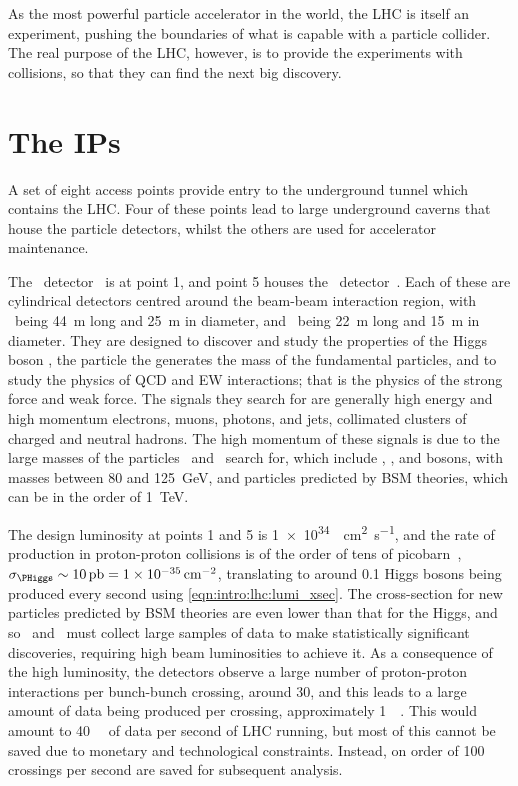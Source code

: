 As the most powerful particle accelerator in the world, the \ac{LHC} is itself 
an experiment, pushing the boundaries of what is capable with a particle 
collider.
The real purpose of the \ac{LHC}, however, is to provide the experiments with 
collisions, so that they can find the next big discovery.

\section{The \aclp{IP}}
\label{chap:intro:lhc:ips}

A set of eight access points provide entry to the underground tunnel which 
contains the \ac{LHC}.
Four of these points lead to large underground caverns that house the particle 
detectors, whilst the others are used for accelerator maintenance.

The \atlas\ detector~\cite{Aad:2008zzm} is at point 1, and point 5 houses the 
\cms\ detector~\cite{Chatrchyan:2008aa}.
Each of these are cylindrical detectors centred around the beam-beam 
interaction region, with \atlas\ being \SI{44}{\metre} long and \SI{25}{\metre} 
in diameter, and \cms\ being \SI{22}{\metre} long and \SI{15}{\metre} in 
diameter.
They are designed to discover and study the properties of the Higgs boson 
\PHiggs, the particle the generates the mass of the fundamental particles, and 
to study the physics of \ac{QCD} and \ac{EW} interactions; that is the physics 
of the strong force and weak force.
The signals they search for are generally high energy and high momentum 
electrons, muons, photons, and jets, collimated clusters of charged and neutral 
hadrons.
The high momentum of these signals is due to the large masses of the particles 
\atlas\ and \cms\ search for, which include \PW, \PZ, and \PHiggs bosons, with 
masses between 80 and \SI{125}{\GeV}, and particles predicted by \ac{BSM} 
theories, which can be in the order of \SI{1}{\TeV}.

The design luminosity at points 1 and 5 is 
\SI{1e34}{\per\square\centi\metre\per\second}, and the rate of \PHiggs 
production in proton-proton collisions is of the order of tens of 
picobarn~\cite{Khachatryan:2016vau}, $\xsec_{\PHiggs} \sim \SI{10}{\pico\barn} 
= \SI{1e-35}{\per\square\centi\metre}$, translating to around 0.1 Higgs bosons 
being produced every second using \cref{eqn:intro:lhc:lumi_xsec}.
The cross-section for new particles predicted by \ac{BSM} theories are even 
lower than that for the Higgs, and so \atlas\ and \cms\ must collect large 
samples of data to make statistically significant discoveries, requiring high 
beam luminosities to achieve it.
As a consequence of the high luminosity, the detectors observe a large number 
of proton-proton interactions per bunch-bunch crossing, around 30, and this 
leads to a large amount of data being produced per crossing, approximately 
\SI{1}{\mega\byte}.
This would amount to \SI{40}{\tera\byte} of data per second of \ac{LHC} 
running, but most of this cannot be saved due to monetary and technological 
constraints.
Instead, on order of 100 crossings per second are saved for subsequent 
analysis.

